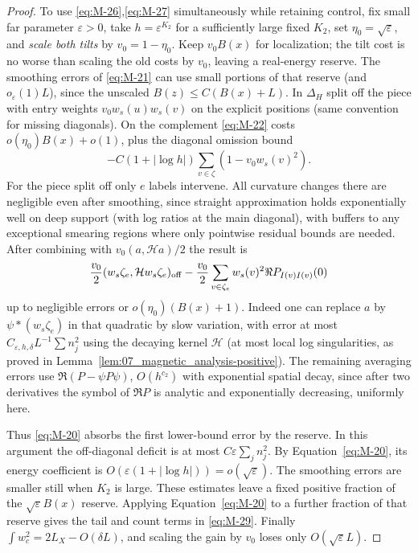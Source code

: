 \begin{proof}
To use \eqref{eq:M-26},\eqref{eq:M-27} simultaneously while retaining control, fix small far parameter \(\varepsilon>0\), take \(h=\varepsilon^{K_2}\) for a sufficiently large fixed \(K_2\), set \(\eta_0=\sqrt{\varepsilon}\), and \emph{scale both tilts} by \(v_0=1-\eta_0\). Keep \(v_0 B(x)\) for localization; the tilt cost is no worse than scaling the old costs by \(v_0\), leaving a real-energy reserve. The smoothing errors of \eqref{eq:M-21} can use small portions of that reserve (and \(o_\varepsilon(1)L\)), since the unscaled \(B(z)\le C(B(x)+L)\). In \(\Delta_H\) split off the piece with entry weights \(v_0 w_s(u)w_s(v)\) on the explicit positions (same convention for missing diagonals). On the complement \eqref{eq:M-22} costs \(o(\eta_0)B(x)+o(1)\), plus the diagonal omission bound
\[
 -C(1+|\log h|)\sum_{v\in\zeta}(1-v_0 w_s(v)^2).
\]
For the piece split off only \(e\) labels intervene. All curvature changes there are negligible even after smoothing, since straight approximation holds exponentially well on deep support (with log ratios at the main diagonal), with buffers to any exceptional smearing regions where only pointwise residual bounds are needed. After combining with \(v_0(a,\mathcal H a)/2\) the result is
\[
 \frac{v_0}2(w_s\zeta_e,\mathcal H w_s\zeta_e)_{\rm off}
 -\frac{v_0}2\sum_{v\in\zeta_e}w_s(v)^2\Re P_{I(v)I(v)}(0)
\]
up to negligible errors or \(o(\eta_0)(B(x)+1)\). Indeed one can replace \(a\) by \(\psi*(w_s\zeta_e)\) in that quadratic by slow variation, with error at most \(C_{\varepsilon,h,\delta} L^{-1}\sum n_j^2\) using the decaying kernel \(\mathcal H\) (at most local log singularities, as proved in Lemma~\ref{lem:07_magnetic_analysis-positive}). The remaining averaging errors use \(\Re(P-\psi P\psi)\), \(O(h^{c_2})\) with exponential spatial decay, since after two derivatives the symbol of \(\Re P\) is analytic and exponentially decreasing, uniformly here.

Thus \eqref{eq:M-20} absorbs the first lower-bound error by the reserve. 
In this argument the off-diagonal deficit is at most
\(C\varepsilon\sum_j n_j^2\). By Equation~\eqref{eq:M-20}, its
energy coefficient is \(O(\varepsilon(1+|\log h|))=o(\sqrt\varepsilon)\).
The smoothing errors are smaller still when \(K_2\) is large.
These estimates leave a fixed positive fraction of the
\(\sqrt\varepsilon B(x)\) reserve. Applying Equation~\eqref{eq:M-20}
to a further fraction of that reserve gives the tail and count terms in
\eqref{eq:M-29}. Finally \(\int w_c^2=2L_X-O(\delta L)\), and scaling the gain
by \(v_0\) loses only \(O(\sqrt\varepsilon L)\).

\end{proof}

